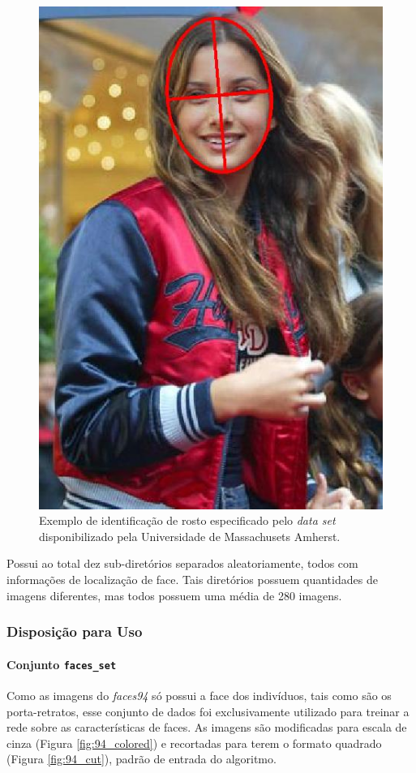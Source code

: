 \documentclass[10pt, conference]{IEEEtran}
\begin{document}
			\begin{figure}[h]
				\centering
				\includegraphics[width=0.8\linewidth]{img/data_set.jpg}
				\caption{Exemplo de identificação de rosto especificado pelo \textit{data set} disponibilizado pela Universidade de Massachusets Amherst.}
				\label{fig:mulher}
			\end{figure}
		
			Possui ao total dez sub-diretórios separados aleatoriamente, todos com informações de localização de face. Tais diretórios possuem quantidades de imagens diferentes, mas todos possuem uma média de 280 imagens.
			
		\subsubsection{Disposição para Uso}
			\paragraph{Conjunto \texttt{faces\_set}}
				Como as imagens do \textit{faces94} só possui a face dos indivíduos, tais como são os porta-retratos, esse conjunto de dados foi exclusivamente utilizado para treinar a rede sobre as características de faces. As imagens são modificadas para escala de cinza (Figura \ref{fig:94_colored}) e recortadas para terem o formato quadrado (Figura \ref{fig:94_cut}), padrão de entrada do algoritmo.
\end{document}

